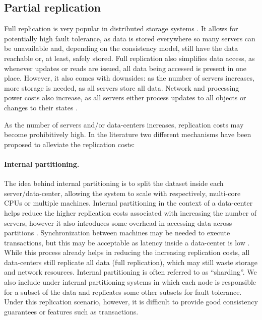 \subsection{Partial replication}

Full replication is very popular in distributed storage systems \cite{sipre}. 
It allows for potentially high fault tolerance, as data is stored everywhere so many servers can be unavailable and, depending on the consistency model, still have the data reachable or, at least, safely stored.
Full replication also simplifies data access, as whenever updates or reads are issued, all data being accessed is present in one place.
However, it also comes with downsides: as the number of servers increases, more storage is needed, as all servers store all data.
Network and processing power costs also increase, as all servers either process updates to all objects or changes to their states \cite{sipre}.

As the number of servers and/or data-centers increases, replication costs may become prohibitively high.
In the literature two different mechanisms have been proposed to alleviate the replication costs:

\paragraph{Internal partitioning.}
The idea behind internal partitioning is to split the dataset inside each server/data-center, allowing the system to scale with respectively, multi-core CPUs or multiple machines.
Internal partitioning in the context of a data-center helps reduce the higher replication costs associated with increasing the number of servers, however it also introduces some overhead in accessing data across partitions \cite{dynamo, cops, mdcc}.
Synchronization between machines may be needed to execute transactions, but this may be acceptable as latency inside a data-center is low \cite{cops}.
While this process already helps in reducing the increasing replication costs, all data-centers still replicate all data (full replication), which may still waste storage and network resources.
Internal partitioning is often referred to as ``sharding''.
We also include under internal partitioning systems \cite{dynamo} in which each node is responsible for a subset of the data and replicates some other subsets for fault tolerance.
Under this replication scenario, however, it is difficult to provide good consistency guarantees or features such as transactions.

